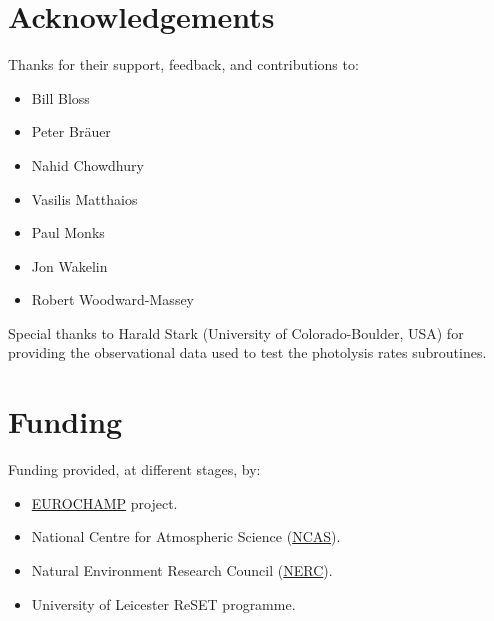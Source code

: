 \section{Acknowledgements} \label{sec:acknowledgements}

Thanks for their support, feedback, and contributions to:

\begin{itemize}
\item Bill Bloss
\item Peter Br{\"a}uer
\item Nahid Chowdhury
\item Vasilis Matthaios
\item Paul Monks
\item Jon Wakelin
\item Robert Woodward-Massey
\end{itemize}

Special thanks to Harald Stark (University of Colorado-Boulder, USA)
for providing the observational data used to test the photolysis rates
subroutines.

\section{Funding} \label{sec:funding}

Funding provided, at different stages, by:

\begin{itemize}
\item \href{https://www.eurochamp.org/}{EUROCHAMP} project.
\item National Centre for Atmospheric Science
  (\href{https://www.ncas.ac.uk/}{NCAS}).
\item Natural Environment Research Council
  (\href{https://nerc.ukri.org/}{NERC}).
\item University of Leicester ReSET programme.
\end{itemize}
